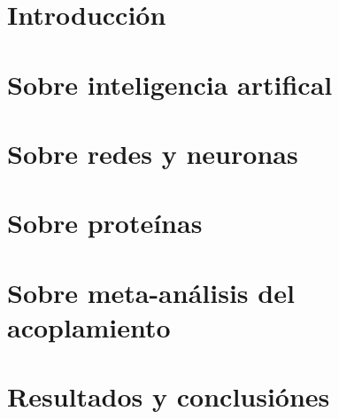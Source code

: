 \documentclass[letterpaper,12pt]{book}
\begin{document}
\frontmatter
    
    \tableofcontents

\mainmatter
    \chapter*{Introducción}
        
    \chapter{Sobre inteligencia artifical}
        
    \chapter{Sobre redes y neuronas}
        
    \chapter{Sobre proteínas}
        
    \chapter{Sobre meta-análisis del acoplamiento}
        
    \chapter{Resultados y conclusiónes}
        




\backmatter
    \nocite{*}
    \printbibliography
\end{document}
